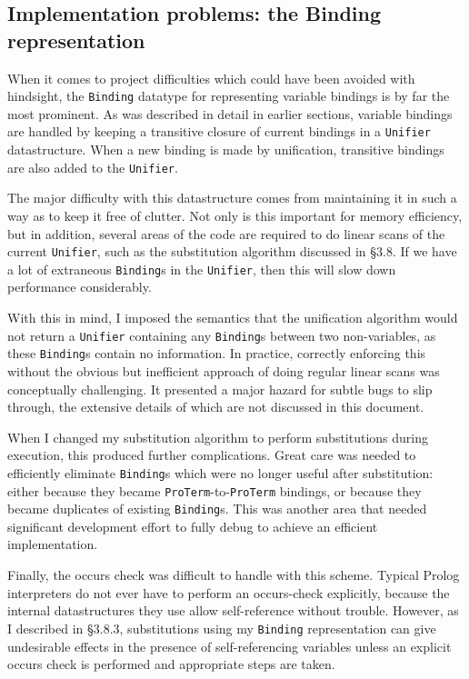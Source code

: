 \documentclass[12pt]{article}
\begin{document}
\subsection{Implementation problems: the Binding representation}

When it comes to project difficulties which could have been avoided with hindsight, the \verb|Binding| datatype for representing variable bindings is by far the most prominent. 
As was described in detail in earlier sections, variable bindings are handled by keeping a transitive closure of current bindings in a \verb|Unifier| datastructure. 
When a new binding is made by unification, transitive bindings are also added to the \verb|Unifier|.

The major difficulty with this datastructure comes from maintaining it in such a way as to keep it free of clutter. 
Not only is this important for memory efficiency, but in addition, several areas of the code are required to do linear scans of the current \verb|Unifier|, such as the substitution algorithm discussed in \S3.8. 
If we have a lot of extraneous \verb|Binding|s in the \verb|Unifier|, then this will slow down performance considerably.

With this in mind, I imposed the semantics that the unification algorithm would not return a \verb|Unifier| containing any \verb|Binding|s between two non-variables, as these \verb|Binding|s contain no information. 
In practice, correctly enforcing this without the obvious but inefficient approach of doing regular linear scans was conceptually challenging. 
It presented a major hazard for subtle bugs to slip through, the extensive details of which are not discussed in this document.

When I changed my substitution algorithm to perform substitutions during execution, this produced further complications. 
Great care was needed to efficiently eliminate \verb|Binding|s which were no longer useful after substitution: either because they became \verb|ProTerm|-to-\verb|ProTerm| bindings, or because they became duplicates of existing \verb|Binding|s. 
This was another area that needed significant development effort to fully debug to achieve an efficient implementation.

Finally, the occurs check was difficult to handle with this scheme. 
Typical Prolog interpreters do not ever have to perform an occurs-check explicitly, because the internal datastructures they use allow self-reference without trouble.
However, as I described in \S3.8.3, substitutions using my \verb|Binding| representation can give undesirable effects in the presence of self-referencing variables unless an explicit occurs check is performed and appropriate steps are taken.
\end{document}
